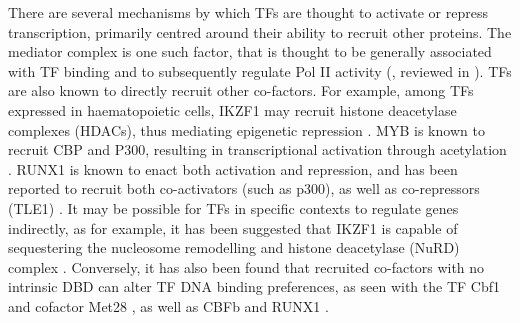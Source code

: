 There are several mechanisms by which TFs are thought to activate or repress transcription, primarily centred around their ability to recruit other proteins. The mediator complex is one such factor, that is thought to be generally associated with TF binding and to subsequently regulate Pol II activity (\cite{baek_human_2006, johnson_tfiid_2002}, reviewed in \cite{allen_mediator_2015}). TFs are also known to directly recruit other co-factors. For example, among TFs expressed in haematopoietic cells, IKZF1 may recruit histone deacetylase complexes (HDACs), thus mediating epigenetic repression \citep{marke_many_2018, kim_ikaros_1999}. MYB is known to recruit CBP and P300, resulting in transcriptional activation through acetylation \citep{dai_cbp_1996, sandberg_c-myb_2005}. RUNX1 is known to enact both activation and repression, and has been reported to recruit both co-activators (such as p300), as well as co-repressors (TLE1) \citep{yamagata_runx1aml1_2005, kitabayashi_interaction_1998, perry_runx1aml1_2002, canon_vivo_2003}. It may be possible for TFs in specific contexts to regulate genes indirectly, as for example, it has been suggested that IKZF1 is capable of sequestering the nucleosome remodelling and histone deacetylase (NuRD) complex \citep{georgopoulos_making_2017}. Conversely, it has also been found that recruited co-factors with no intrinsic DBD can alter TF DNA binding preferences, as seen with the TF Cbf1 and cofactor Met28 \citep{siggers_non-dna-binding_2011}, as well as CBFb and RUNX1 \citep{wang_cbfbeta_1996, ogawa_molecular_1993}.


